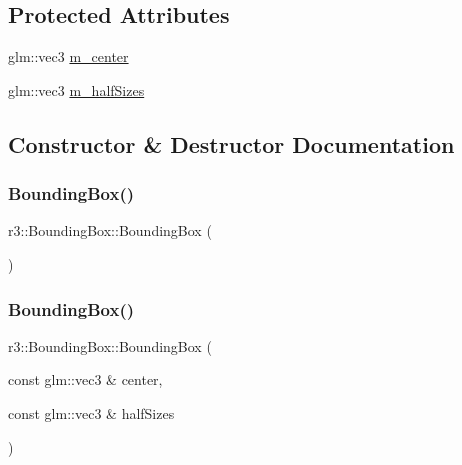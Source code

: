 \subsection*{Protected Attributes}
\begin{DoxyCompactItemize}
\item 
glm\+::vec3 \mbox{\hyperlink{classr3_1_1_bounding_box_ae7f47ade2f27fb7e76da58c944141d80}{m\+\_\+center}}
\item 
glm\+::vec3 \mbox{\hyperlink{classr3_1_1_bounding_box_ac95d88875ec61c04133186507bc613dc}{m\+\_\+half\+Sizes}}
\end{DoxyCompactItemize}


\subsection{Constructor \& Destructor Documentation}
\mbox{\label{classr3_1_1_bounding_box_a088852419e2b7af17f2e94d672a70bcf}} 
\subsubsection{\texorpdfstring{Bounding\+Box()}{BoundingBox()}\hspace{0.1cm}{\footnotesize\ttfamily [1/3]}}
{\footnotesize\ttfamily r3\+::\+Bounding\+Box\+::\+Bounding\+Box (\begin{DoxyParamCaption}{ }\end{DoxyParamCaption})}

\mbox{\label{classr3_1_1_bounding_box_a871e0ce668df300a9a88eef1069d1874}} 
\subsubsection{\texorpdfstring{Bounding\+Box()}{BoundingBox()}\hspace{0.1cm}{\footnotesize\ttfamily [2/3]}}
{\footnotesize\ttfamily r3\+::\+Bounding\+Box\+::\+Bounding\+Box (\begin{DoxyParamCaption}\item[{const glm\+::vec3 \&}]{center,  }\item[{const glm\+::vec3 \&}]{half\+Sizes }\end{DoxyParamCaption})}



